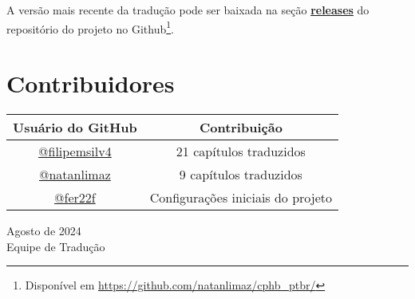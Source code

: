 A versão mais recente da tradução pode ser baixada na seção \href{https://github.com/natanlimaz/cphb_ptbr/releases}{\textbf{releases}} do repositório do projeto no Github\footnote{Disponível em \url{https://github.com/natanlimaz/cphb_ptbr/}}.

\bigskip

\section*{Contribuidores}

\begin{center}
\begin{tabular}{|c|c|}
\hline
\textbf{Usuário do GitHub} & \textbf{Contribuição} \\ \hline
\href{https://github.com/filipemsilv4}{@filipemsilv4} & 21 capítulos traduzidos \\ \hline
\href{https://github.com/natanlimaz}{@natanlimaz} & 9 capítulos traduzidos \\ \hline
\href{https://github.com/fer22f}{@fer22f} & Configurações iniciais do projeto \\ \hline
\end{tabular}
\end{center}

\bigskip

\begin{flushright}
Agosto de 2024 \\
Equipe de Tradução
\end{flushright}